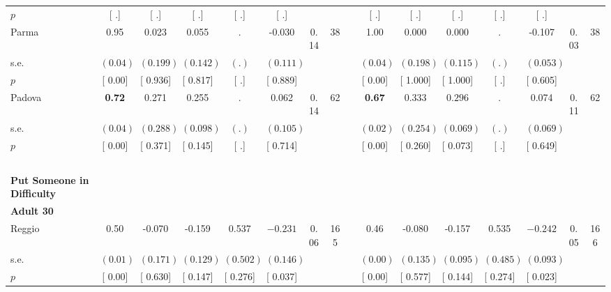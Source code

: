 \begin{longtable}{L{8em} c c c c c c c p{1em} c c c c c c c}
\quad \quad \quad \quad $ p$ & [        .] & [        .] & [        .] & [        .] & [        .] & & & & [        .] & [        .] & [        .] & [        .] & [        .] & &  \\[1em]
\quad \quad \quad Parma& 0.95 &     0.023 &     0.055 &         . &    -0.030 &      0.14 &        38 & & 1.00 &     0.000 &     0.000 &         . &    -0.107 &      0.03 &        38  \\*
\quad \quad \quad \quad s.e.& $ (     0.04)$ & $ (    0.199)$ & $ (    0.142)$ & $ (        .)$ & $ (    0.111)$ & & & & $ (     0.04)$ & $ (    0.198)$ & $ (    0.115)$ & $ (        .)$ & $ (    0.053)$ & &  \\*
\quad \quad \quad \quad $ p$ & [     0.00] & [    0.936] & [    0.817] & [        .] & [    0.889] & & & & [     0.00] & [    1.000] & [    1.000] & [        .] & [    0.605] & &  \\[1em]
\quad \quad \quad Padova& \textbf{     0.72} &     0.271 &     0.255 &         . &     0.062 &      0.14 &        62 & & \textbf{     0.67} &     0.333 & $ \mathbf{    0.296}$ &         . &     0.074 &      0.11 &        62  \\*
\quad \quad \quad \quad s.e.& $ (     0.04)$ & $ (    0.288)$ & $ (    0.098)$ & $ (        .)$ & $ (    0.105)$ & & & & $ (     0.02)$ & $ (    0.254)$ & $ (    0.069)$ & $ (        .)$ & $ (    0.069)$ & &  \\*
\quad \quad \quad \quad $ p$ & [     0.00] & [    0.371] & [    0.145] & [        .] & [    0.714] & & & & [     0.00] & [    0.260] & [    0.073] & [        .] & [    0.649] & &  \\[1em]
~\\[1em]
\textbf{Put Someone in Difficulty} \\*
\quad \quad \textbf{Adult 30} & & & & & & & & & & & & & & & \\* 
\quad \quad \quad Reggio& 0.50 &    -0.070 &    -0.159 &     0.537 & $ \mathbf{   -0.231}$ &      0.06 &       165 & & 0.46 &    -0.080 &    -0.157 &     0.535 & $ \mathbf{   -0.242}$ &      0.05 &       166  \\*
\quad \quad \quad \quad s.e.& $ (     0.01)$ & $ (    0.171)$ & $ (    0.129)$ & $ (    0.502)$ & $ (    0.146)$ & & & & $ (     0.00)$ & $ (    0.135)$ & $ (    0.095)$ & $ (    0.485)$ & $ (    0.093)$ & &  \\*
\quad \quad \quad \quad $ p$ & [     0.00] & [    0.630] & [    0.147] & [    0.276] & [    0.037] & & & & [     0.00] & [    0.577] & [    0.144] & [    0.274] & [    0.023] & &  \\[1em]

\end{longtable}
